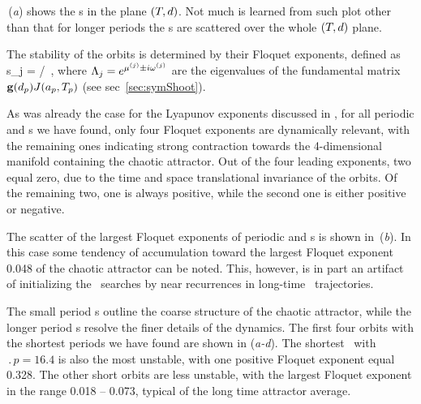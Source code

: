 \,(\textit{a}) shows the \rpo s in the plane
$({T_{}},d)$.  Not much is learned from such plot other than
that for longer periods the \rpo s are scattered over the
whole $({T_{}},d)$ plane.

The stability of the orbits is determined by their Floquet exponents,
defined as
\beq
    s_j = \eigRe[j]/ \,,
where $\ExpaEig_j = e^{\eigRe[j] \pm i \eigIm[j]}$ are the
eigenvalues of the fundamental matrix $\mathbf{g}(d_p)J(a_p,{T_{p}})$
(see sec~\ref{sec:symShoot}).

As was already the case for the Lyapunov exponents
discussed in , for all
periodic and \rpo s we have found, only four Floquet
exponents are dynamically relevant, with the remaining ones indicating
strong contraction towards the 4-dimensional manifold containing the chaotic attractor.
Out of the four leading exponents, two equal zero, due to
the time and space translational invariance of the orbits.  Of the
remaining two, one is always positive, while the second one is
either positive or negative.

The scatter of the largest Floquet exponents
of periodic and \rpo s is shown in \,(\textit{b}).
In this case some tendency of accumulation toward the largest
Floquet exponent 0.048 of the chaotic attractor
can be noted.  This, however, is in part an artifact of initializing
the \rpo\ searches by near recurrences in long-time \statesp\
trajectories.

The small period \rpo s outline the coarse structure of the chaotic
attractor, while the longer period \rpo s resolve the finer details
of the dynamics.
The first four orbits with the shortest periods we have found are
shown in \reffig{f:ks22rpos}(\textit{a-d}).  The shortest \rpo\ with
$\period{p} = 16.4$ is also the most unstable, with one positive
Floquet exponent equal 0.328.  The other short orbits are less
unstable, with the largest Floquet exponent
in the range
0.018 -- 0.073, typical of the long time attractor average.

